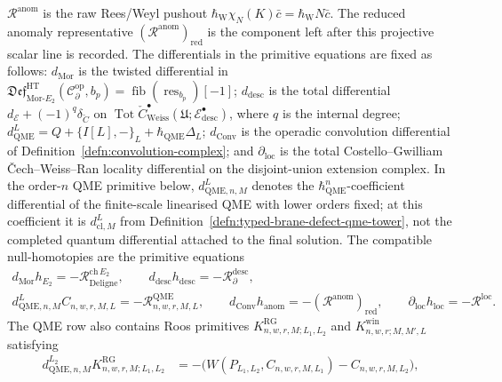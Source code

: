 \begin{thm}
\(\mathcal R^{\mathrm{anom}}\) is the raw Rees/Weyl pushout
\(\hbar_{\mathrm{W}}\chi_N(K)\bar c
=\hbar_{\mathrm{W}}N\bar c\).  The reduced anomaly
representative \((\mathcal R^{\mathrm{anom}})_{\mathrm{red}}\) is the
component left after this projective scalar line is recorded.
The differentials in the primitive equations are fixed as follows:
\(d_{\mathrm{Mor}}\) is the twisted differential in
\(\mathfrak{Def}^{\mathrm{HT}}_{\mathrm{Mor}\mbox{-}E_2}
(\mathcal C^{\mathrm{op}}_\partial,b_p)
=\operatorname{fib}(\operatorname{res}_{b_p})[-1]\);
\(d_{\mathrm{desc}}\) is the total differential
\(d_{\mathcal E}+(-1)^q\delta_{\check C}\) on
\(\operatorname{Tot}\check C^\bullet_{\mathrm{Weiss}}
(\mathfrak U;\mathcal E^\bullet_{\mathrm{desc}})\), where \(q\) is the
internal degree; \(d_{\mathrm{QME}}^{L}=Q+\{I[L],-\}_L+\hbar_{\mathrm{QME}}\Delta_L\);
\(d_{\mathrm{Conv}}\) is the operadic convolution differential of
Definition~\ref{defn:convolution-complex}; and
\(\partial_{\mathrm{loc}}\) is the total Costello--Gwilliam
\v{C}ech--Weiss--Ran locality differential on the disjoint-union
extension complex.  In the order-\(n\) QME primitive below,
\(d^{L}_{\mathrm{QME},n,M}\) denotes the
\(\hbar_{\mathrm{QME}}^n\)-coefficient differential of the finite-scale
linearised QME with lower orders fixed; at this coefficient it is
\(d^L_{\mathrm{cl},M}\) from
Definition~\ref{defn:typed-brane-defect-qme-tower}, not the completed
quantum differential attached to the final solution.
The compatible null-homotopies are the primitive equations
\begin{equation}\label{eq:global-five-primitive-equations}
\begin{gathered}
  d_{\mathrm{Mor}}h_{E_2}
  =-\mathcal R^{\mathrm{ch}\,E_2}_{\mathrm{Deligne}},\qquad
  d_{\mathrm{desc}}h_{\mathrm{desc}}
  =-\mathcal R^{\mathrm{desc}}_{\partial},\\
  d^{L}_{\mathrm{QME},n,M}C_{n,w,r,M,L}
  =-\mathcal R^{\mathrm{QME}}_{n,w,r,M,L},\qquad
  d_{\mathrm{Conv}}h_{\mathrm{anom}}
  =-(\mathcal R^{\mathrm{anom}})_{\mathrm{red}},\qquad
  \partial_{\mathrm{loc}}h_{\mathrm{loc}}
  =-\mathcal R^{\mathrm{loc}} .
\end{gathered}
\end{equation}
The QME row also contains Roos primitives
\(K^{\mathrm{RG}}_{n,w,r,M;L_1,L_2}\) and
\(K^{\mathrm{win}}_{n,w,r;M,M',L}\) satisfying
\[
  \begin{aligned}
  d^{L_2}_{\mathrm{QME},n,M}K^{\mathrm{RG}}_{n,w,r,M;L_1,L_2}
  &=
  -\bigl(W(P_{L_1,L_2},C_{n,w,r,M,L_1})-C_{n,w,r,M,L_2}\bigr),\\

\end{aligned}\]
\end{thm}
